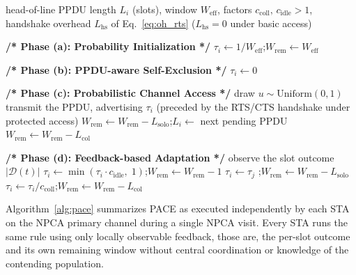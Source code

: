 \documentclass[a4paper,fleqn]{cas-dc}
\newcommand{\PHASE}[1]{\item[]{\normalfont\bfseries #1}}
\begin{document}
\begin{algorithm}[t]
\caption{PACE at STA $i$ during one NPCA visit}
\label{alg:pace}
\begin{algorithmic}[1]
\REQUIRE head-of-line PPDU length $L_i$ (slots), window $W_\mathrm{eff}$, factors $c_\mathrm{coll},\,c_\mathrm{idle}>1$, handshake overhead $L_\mathrm{hs}$ of Eq.~\eqref{eq:oh_rts} ($L_\mathrm{hs}=0$ under basic access)
\PHASE {/* Phase (a): Probability Initialization */}
\STATE $\tau_i \leftarrow 1/W_\mathrm{eff}$;\quad $W_\mathrm{rem} \leftarrow W_\mathrm{eff}$
    \PHASE {/* Phase (b): PPDU-aware Self-Exclusion */}
        \STATE $\tau_i \leftarrow 0$
    \ENDIF
    \PHASE {/* Phase (c): Probabilistic Channel Access */}
    \STATE draw $u \sim \mathrm{Uniform}(0,1)$
        \STATE transmit the PPDU, advertising $\tau_i$ (preceded by the RTS/CTS handshake under protected access)
            \STATE $W_\mathrm{rem} \leftarrow W_\mathrm{rem} - L_\mathrm{solo}$;\quad $L_i \leftarrow$ next pending PPDU
        \ELSE
            \STATE $W_\mathrm{rem} \leftarrow W_\mathrm{rem} - L_\mathrm{col}$ 
        \ENDIF
    \ELSE
        \PHASE {/* Phase (d): Feedback-based Adaptation */}
        \STATE observe the slot outcome $|\mathcal{D}(t)|$
            \STATE $\tau_i \leftarrow \min(\tau_i \cdot c_\mathrm{idle},\;1)$;\quad $W_\mathrm{rem} \leftarrow W_\mathrm{rem} - 1$
            \STATE $\tau_i \leftarrow \tau_j$ ;\quad $W_\mathrm{rem} \leftarrow W_\mathrm{rem} - L_\mathrm{solo}$
        \ELSE
            \STATE $\tau_i \leftarrow \tau_i / c_\mathrm{coll}$;\quad $W_\mathrm{rem} \leftarrow W_\mathrm{rem} - L_\mathrm{col}$
        \ENDIF
    \ENDIF
\ENDWHILE
\end{algorithmic}
\end{algorithm}

Algorithm~\ref{alg:pace} summarizes PACE as executed independently by each STA on the NPCA primary channel during a single NPCA visit. Every STA runs the same rule using only locally observable feedback, those are, the per-slot outcome and its own remaining window without central coordination or knowledge of the contending population.

\end{document}
